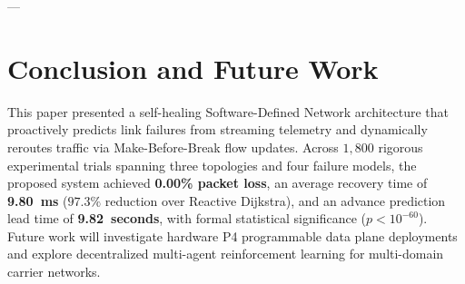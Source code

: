 \documentclass[10pt,twocolumn]{article}
\begin{document}
---

\section{Conclusion and Future Work}
\label{sec:conclusion}
This paper presented a self-healing Software-Defined Network architecture that proactively predicts link failures from streaming telemetry and dynamically reroutes traffic via Make-Before-Break flow updates. Across $1{,}800$ rigorous experimental trials spanning three topologies and four failure models, the proposed system achieved \textbf{0.00\% packet loss}, an average recovery time of \textbf{9.80~ms} ($97.3\%$ reduction over Reactive Dijkstra), and an advance prediction lead time of \textbf{9.82~seconds}, with formal statistical significance ($p < 10^{-60}$). Future work will investigate hardware P4 programmable data plane deployments and explore decentralized multi-agent reinforcement learning for multi-domain carrier networks.

\balance


\end{document}
